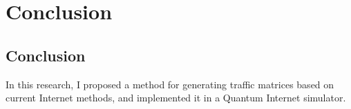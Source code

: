 \chapter{Conclusion}
\label{conclusion}
\section{Conclusion}
In this research, I proposed a method for generating traffic matrices based on current Internet methods, and implemented it in a Quantum Internet simulator.



